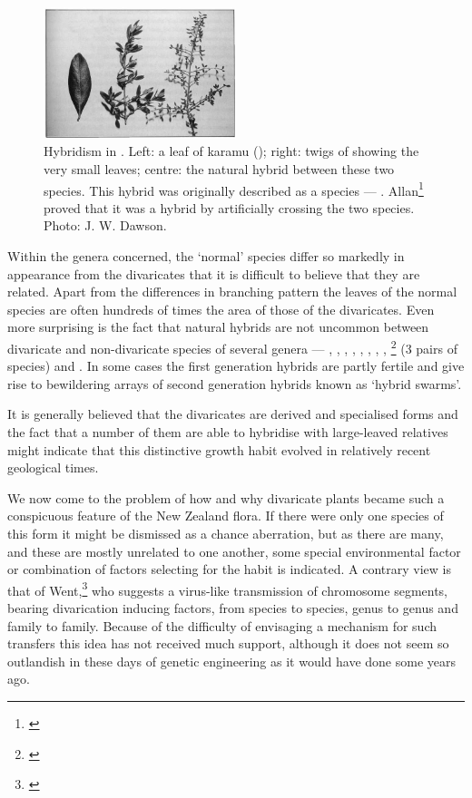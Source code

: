 \begin{figure}
	\includegraphics[width=0.5\textwidth]{graphics/figure80coprosma.jpg}
	\centering
	\caption[Hybridism in Coprosma]{Hybridism in .
    Left: a leaf of karamu (); right: twigs of  showing the very small leaves; centre: the natural hybrid between these two species.
    This hybrid was originally described as a species — .
    Allan\footnote{\cite{cockayne1912observations}} proved that it was a hybrid by artificially crossing the two species.
    Photo:  J. W. Dawson.}
	\label{fig:80coprosma}
\end{figure}

Within the genera concerned, the `normal' species differ so markedly in appearance from the divaricates that it is difficult to believe that they are related.
Apart from the differences in branching pattern the leaves of the normal species are often hundreds of times the area of those of the divaricates.
Even more surprising is the fact that natural hybrids are not uncommon between divaricate and non-divaricate species of several genera — , , , , , , , , \footnote{\cite{allan1924hybridity}} (3 pairs of species) and .
In some cases the first generation hybrids are partly fertile and give rise to bewildering arrays of second generation hybrids known as `hybrid swarms'.

It is generally believed that the divaricates are derived and specialised forms and the fact that a number of them are able to hybridise with large-leaved relatives might indicate that this distinctive growth habit evolved in relatively recent geological times.

We now come to the problem of how and why divaricate plants became such a conspicuous feature of the New Zealand flora.
If there were only one species of this form it might be dismissed as a chance aberration, but as there are many, and these are mostly unrelated to one another, some special environmental factor or combination of factors selecting for the habit is indicated.
A contrary view is that of Went,\footnote{\cite{went1971parallel}} who suggests a virus-like transmission of chromosome segments, bearing divarication inducing factors, from species to species, genus to genus and family to family.
Because of the difficulty of envisaging a mechanism for such transfers this idea has not received much support, although it does not seem so outlandish in these days of genetic engineering as it would have done some years ago.

